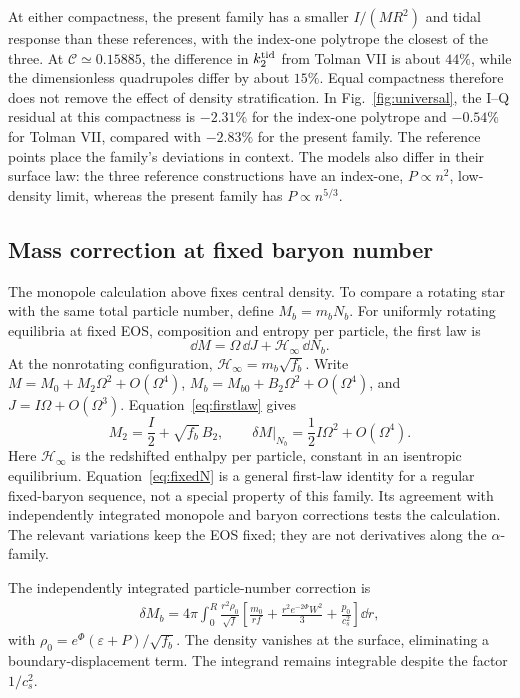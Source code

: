At either compactness, the present family has a smaller $I/(MR^2)$ and tidal response than these references, with the index-one polytrope the closest of the three. At $\mathcal C\simeq0.15885$, the difference in $k_2^{\rm tid}$ from Tolman VII is about $44\%$, while the dimensionless quadrupoles differ by about $15\%$. Equal compactness therefore does not remove the effect of density stratification. In Fig.~\ref{fig:universal}, the I--Q residual at this compactness is $-2.31\%$ for the index-one polytrope and $-0.54\%$ for Tolman VII, compared with $-2.83\%$ for the present family. The reference points place the family's deviations in context. The models also differ in their surface law: the three reference constructions have an index-one, $P\propto n^2$, low-density limit, whereas the present family has $P\propto n^{5/3}$.

\subsection{Mass correction at fixed baryon number}
The monopole calculation above fixes central density. To compare a rotating star with the same total particle number, define $M_b=m_bN_b$. For uniformly rotating equilibria at fixed EOS, composition and entropy per particle, the first law is~\cite{bardeen}
\begin{equation}
 \dd M=\Omega\,\dd J+\mathcal H_\infty\,\dd N_b.
 \label{eq:firstlaw}
\end{equation}
At the nonrotating configuration, $\mathcal H_\infty=m_b\sqrt{f_b}$. Write $M=M_0+M_2\Omega^2+O(\Omega^4)$, $M_b=M_{b0}+B_2\Omega^2+O(\Omega^4)$, and $J=I\Omega+O(\Omega^3)$. Equation~\eqref{eq:firstlaw} gives
\begin{equation}
 M_2=\frac I2+\sqrt{f_b}\,B_2,
 \qquad
 \left.\delta M\right|_{N_b}=\frac12I\Omega^2+O(\Omega^4).
 \label{eq:fixedN}
\end{equation}
Here $\mathcal H_\infty$ is the redshifted enthalpy per particle, constant in an isentropic equilibrium. Equation~\eqref{eq:fixedN} is a general first-law identity for a regular fixed-baryon sequence, not a special property of this family. Its agreement with independently integrated monopole and baryon corrections tests the calculation. The relevant variations keep the EOS fixed; they are not derivatives along the $\alpha$-family.

The independently integrated particle-number correction is
\begin{align}
 \delta M_b=4\pi\int_0^R\frac{r^2\rho_0}{\sqrt f}
 \left[\frac{m_0}{rf}+\frac{r^2e^{-2\Phi}W^2}{3}
                  +\frac{p_0}{c_s^2}\right]\dd r,
 \label{eq:baryon}
\end{align}
with $\rho_0=e^\Phi(\varepsilon+P)/\sqrt{f_b}$. The density vanishes at the surface, eliminating a boundary-displacement term. The integrand remains integrable despite the factor $1/c_s^2$.

